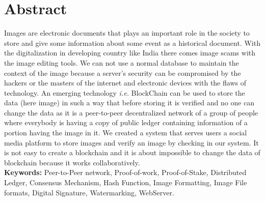 \newpage
\chapter*{Abstract}
Images are electronic documents that plays an important role in the society to store and give some information about some event as a historical document. With the digitalization in developing country like India there comes image scams with the image editing tools. We can not use a normal database to maintain the context of the image because a server's security can be compromised by the hackers or the masters of the internet and electronic devices with the flaws of technology.
An emerging technology \textit{i.e.} BlockChain can be used to store the data (here image) in such a way that before storing it is verified and no one can change the data as it is a peer-to-peer decentralized network of a group of people where everybody is having a copy of public ledger containing information of a portion having the image in it.
We created a system that serves users a social media platform to store images and verify an image by checking in our system.
It is not easy to create a blockchain and it is about impossible to change the data of blockchain because it works collaboratively.\\

\textbf{Keywords:} Peer-to-Peer network, Proof-of-work, Proof-of-Stake, Distributed Ledger, Consensus Mechanism, Hash Function, Image Formatting, Image File formats, Digital Signature, Watermarking, WebServer.
